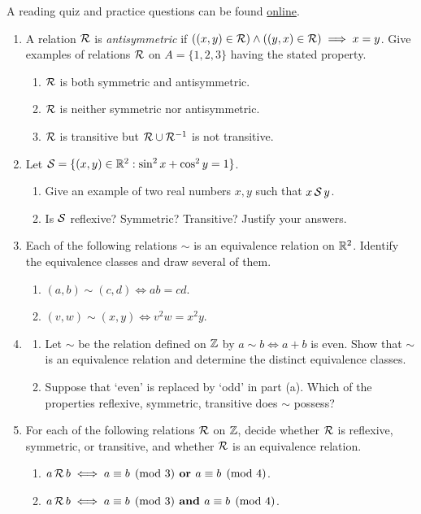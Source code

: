 \begin{exercises}{}{}
	A reading quiz and practice questions can be found \href{http://www.math.uci.edu/~ndonalds/math13/selftest/7-3-equivreln.html}{online}.

\begin{enumerate}
	\item A relation $\mathcal{R}$ is \emph{antisymmetric} if $((x,y)\in \mathcal{R})\wedge((y,x)\in \mathcal{R})\implies x=y$. Give examples of relations $\mathcal{R}$ on $A=\{1,2,3\}$ having the stated property.
	\begin{enumerate}
		\item $\mathcal{R}$ is both symmetric and antisymmetric.
		\item $\mathcal{R}$ is neither symmetric nor antisymmetric.
		\item $\mathcal{R}$ is transitive but $\mathcal{R}\cup \mathcal{R}^{-1}$ is not transitive.
	\end{enumerate}
	
	\item Let $\mathcal{S}=\{(x,y)\in\mathbb{R}^2:\sin^2x+\cos^2y=1\}$.
	\begin{enumerate}
	  \item Give an example of two real numbers $x,y$ such that $x\,\mathcal{S}\,y$.
	  \item Is $\mathcal{S}$ reflexive? Symmetric? Transitive? Justify your answers.
	\end{enumerate}

	\item Each of the following relations $\sim$ is an equivalence relation on $\mathbb{R}^2$. Identify the equivalence classes and draw several of them.
	\begin{enumerate}
		\item $(a,b)\sim(c,d)\iff ab=cd$.
	  \item $(v,w)\sim(x,y)\iff v^2w=x^2y$.
	\end{enumerate}
	
  \item\begin{enumerate}
  \item Let $\sim$ be the relation defined on $\mathbb{Z}$ by $a\sim b\iff a+b$ is even. Show that $\sim$ is an equivalence relation and determine the distinct equivalence classes.
  \item Suppose that `even' is replaced by `odd' in part (a). Which of the properties reflexive, symmetric, transitive does $\sim$ possess?
  \end{enumerate}

  \item For each of the following relations $\mathcal{R}$ on $\mathbb{Z}$, decide whether $\mathcal{R}$ is reflexive, symmetric, or transitive, and whether $\mathcal{R}$ is an equivalence relation.
	\begin{enumerate}
		\item $a\,\mathcal{R}\,b \iff a\equiv b\pmod 3 \textbf{ or } a\equiv b\pmod 4$.
		\item $a\,\mathcal{R}\,b \iff a\equiv b\pmod 3 \textbf{ and } a\equiv b\pmod 4$.
	\end{enumerate}


\end{enumerate}
\end{exercises}
